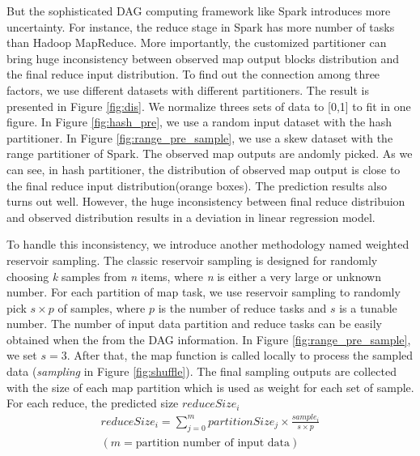 But the sophisticated DAG computing framework like Spark introduces more uncertainty. For instance, the reduce stage in Spark has more number of tasks than Hadoop MapReduce. More importantly, the customized partitioner can bring huge inconsistency between observed map output blocks distribution and the final reduce input distribution. To find out the connection among three factors, we use different datasets with different partitioners. The result is presented in Figure \ref{fig:dis}. We normalize threes sets of data to [0,1] to fit in one figure. In Figure \ref{fig:hash_pre}, we use a random input dataset with the hash partitioner. In Figure \ref{fig:range_pre_sample}, we use a skew dataset with the range partitioner of Spark\cite{sparksource}.
The observed map outputs are andomly picked. As we can see, in hash partitioner, the distribution of observed map output is close to the final reduce input distribution(orange boxes). The prediction results also turns out well. However, the huge inconsistency between final reduce distribuion and observed distribution results in a deviation in linear regression model.

To handle this inconsistency, we introduce another methodology named weighted reservoir sampling. The classic reservoir sampling is designed for randomly choosing \textit{k} samples from \textit{n} items, where \textit{n} is either a very large or unknown number\cite{reservoir}. For each partition of map task, we use reservoir sampling to randomly pick $s \times p$ of samples, where $p$ is the number of reduce tasks and $s$ is a tunable number. The number of input data partition and reduce tasks can be easily obtained when the from the DAG information. In Figure \ref{fig:range_pre_sample}, we set $s = 3$. After that, the map function is called locally to process the sampled data (\textit{sampling} in Figure \ref{fig:shuffle}). The final sampling outputs are collected with the size of each map partition which is used as weight for each set of sample. For each reduce, the predicted size $reduceSize_i$
\begin{equation}
\label{equationsample} 
\begin{aligned}
	reduceSize_i = {\displaystyle\sum_{j=0}^{m} {partitionSize_j \times \frac{sample_i}{s \times p}}} \\ 
	{\left( m = \text{partition number of input data} \right)}
\end{aligned}
\end{equation}

